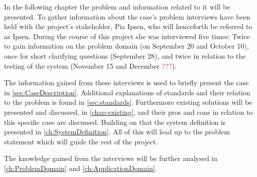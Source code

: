 In the following chapter the problem and information related to it will be presented.
To gather information about the case's problem interviews have been held with the project's stakeholder, Pia Ipsen, who will henceforth be referred to as Ipsen. 
During the course of this project she was interviewed five times: 
Twice to gain information on the problem domain (on September 20 and October 10),
once for short clarifying questions (September 28),
and twice in relation to the testing of the system (November 15 and December \textcolor{red}{???}).

The information gained from these interviews is used to briefly present the case in \cref{sec:CaseDescription}. 
Additional explanations of standards and their relation to the problem is found in \cref{sec:standards}.
Furthermore existing solutions will be presented and discussed, in \cref{chap:existing}, and their pros and cons in relation to this specific case are discussed.
Building on that the system definition is presented in \cref{ch:SystemDefinition}.
All of this will lead up to the problem statement which will guide the rest of the project.

The knowledge gained from the interviews will be further analysed in \cref{ch:ProblemDomain} and \cref{ch:ApplicationDomain}.